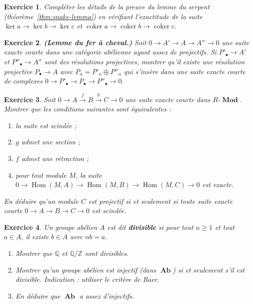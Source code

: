 \documentclass[a4paper,12pt]{book}
\DeclareMathOperator{\Hom}{Hom}
\DeclareMathOperator{\coker}{coker}
\DeclareMathOperator{\Ab}{\mathbf{Ab}}
\DeclareMathOperator{\Mod}{\mathbf{Mod}}
\newcommand{\Z}{\mathbb{Z}}
\newcommand{\Q}{\mathbb{Q}}
\newtheorem{exercice}{Exercice}[chapter]
\begin{document}
\begin{exercice}\label{exo:snake-details}
Compléter les détails de la preuve du lemme du serpent
(théorème~\ref{thm:snake-lemma}) en vérifiant l'exactitude de la suite
$\ker a \to \ker b \to \ker c$ et $\coker a \to \coker b \to \coker c$.
\end{exercice}

\begin{exercice}\label{exo:horseshoe}
\textbf{(Lemme du fer à cheval.)}
Soit $0 \to A' \to A \to A'' \to 0$ une suite exacte courte dans
une catégorie abélienne ayant assez de projectifs. Si $P'_\bullet \to A'$
et $P''_\bullet \to A''$ sont des résolutions projectives, montrer qu'il
existe une résolution projective $P_\bullet \to A$ avec
$P_n = P'_n \oplus P''_n$ qui s'insère dans une suite exacte courte
de complexes $0 \to P'_\bullet \to P_\bullet \to P''_\bullet \to 0$.
\end{exercice}

\begin{exercice}\label{exo:ses-projective}
Soit $0 \to A \xrightarrow{f} B \xrightarrow{g} C \to 0$ une suite
exacte courte dans $R\text{-}\Mod$. Montrer que les conditions
suivantes sont équivalentes :
\begin{enumerate}[label=(\roman*)]
\item la suite est scindée ;
\item $g$ admet une section ;
\item $f$ admet une rétraction ;
\item pour tout module $M$, la suite
  $0 \to \Hom(M, A) \to \Hom(M, B) \to \Hom(M, C) \to 0$ est exacte.
\end{enumerate}
En déduire qu'un module $C$ est projectif si et seulement si toute suite
exacte courte $0 \to A \to B \to C \to 0$ est scindée.
\end{exercice}

\begin{exercice}\label{exo:injective-divisible}
Un groupe abélien $A$ est dit \textbf{divisible} si pour
tout $n \geq 1$ et tout $a \in A$, il existe $b \in A$ avec $nb = a$.
\begin{enumerate}[label=(\alph*)]
\item Montrer que $\Q$ et $\Q/\Z$ sont divisibles.
\item Montrer qu'un groupe abélien est injectif (dans $\Ab$) si et seulement
  s'il est divisible.
  \textit{Indication : utiliser le critère de Baer.}
\item En déduire que $\Ab$ a assez d'injectifs.
\end{enumerate}
\end{exercice}
\end{document}
